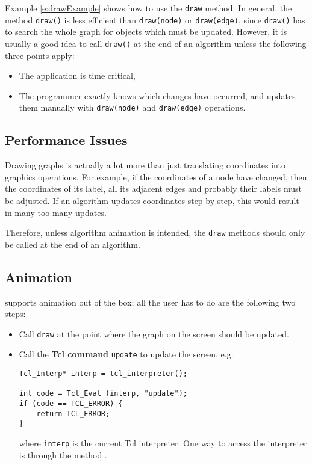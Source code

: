 \documentclass[twoside,fleqn]{report}
\begin{document}
\noindent Example \ref{e:drawExample} shows how to use the
\texttt{draw} method.  In general, the method \texttt{draw()} is
less efficient than \texttt{draw(node)} or \texttt{draw(edge)},
since \texttt{draw()} has to search the whole graph for objects
which must be updated.  However, it is usually a good idea to
call \texttt{draw()} at the end of an algorithm unless the
following three points apply:

\begin{itemize}
  \item The application is time critical,
  
  \item The programmer exactly knows which changes have occurred,
  and updates them manually with \texttt{draw(node)} and
  \texttt{draw(edge)} operations.
  
\end{itemize}


%
%

\subsection{Performance Issues}

Drawing graphs is actually a lot more than just translating
coordinates into graphics operations. For example, if the
coordinates of a node have changed, then the coordinates of its
label, all its adjacent edges and probably their labels must be
adjusted. If an algorithm updates coordinates step-by-step, this
would result in many too many updates.

Therefore, unless algorithm animation is intended, the
\texttt{draw} methods should only be called at the end of
an algorithm. 


%
%
%

\subsection{Animation}

 supports animation out of the box; all the user has
to do are the following two steps:

\begin{itemize}
  
  \item Call \texttt{draw} at the point where the graph on the
  screen should be updated.
  
  \item Call the \textbf{Tcl command} \texttt{update} to update the
  screen, e.g.
  \begin{verbatim}
Tcl_Interp* interp = tcl_interpreter();

int code = Tcl_Eval (interp, "update");
if (code == TCL_ERROR) {
    return TCL_ERROR;
}
  \end{verbatim}

  where \texttt{interp} is the current Tcl interpreter. One way to
  access the interpreter is through the method .

\end{itemize}
\end{document}
